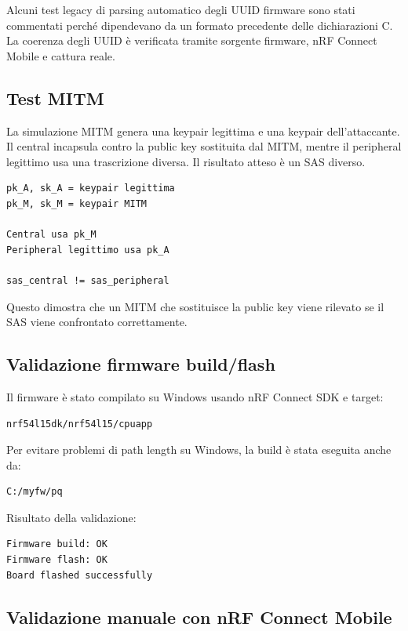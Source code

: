 \documentclass[11pt,a4paper]{article}
\begin{document}
Alcuni test legacy di parsing automatico degli UUID firmware sono stati
commentati perché dipendevano da un formato precedente delle
dichiarazioni C. La coerenza degli UUID è verificata tramite sorgente
firmware, nRF Connect Mobile e cattura reale.

\subsection{Test MITM}\label{test-mitm}

La simulazione MITM genera una keypair legittima e una keypair
dell'attaccante. Il central incapsula contro la public key sostituita
dal MITM, mentre il peripheral legittimo usa una trascrizione diversa.
Il risultato atteso è un SAS diverso.

\begin{lstlisting}
pk_A, sk_A = keypair legittima
pk_M, sk_M = keypair MITM

Central usa pk_M
Peripheral legittimo usa pk_A

sas_central != sas_peripheral
\end{lstlisting}

Questo dimostra che un MITM che sostituisce la public key viene rilevato
se il SAS viene confrontato correttamente.

\subsection{Validazione firmware
build/flash}\label{validazione-firmware-buildflash}

Il firmware è stato compilato su Windows usando nRF Connect SDK e
target:

\begin{lstlisting}
nrf54l15dk/nrf54l15/cpuapp
\end{lstlisting}

Per evitare problemi di path length su Windows, la build è stata
eseguita anche da:

\begin{lstlisting}
C:/myfw/pq
\end{lstlisting}

Risultato della validazione:

\begin{lstlisting}
Firmware build: OK
Firmware flash: OK
Board flashed successfully
\end{lstlisting}

\subsection{Validazione manuale con nRF Connect
Mobile}\label{validazione-manuale-con-nrf-connect-mobile}
\end{document}
